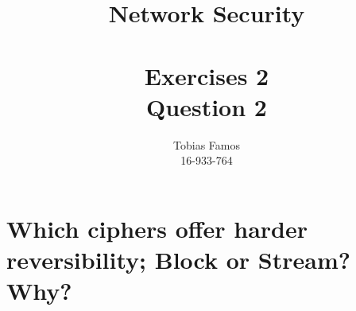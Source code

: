 \documentclass[11pt,a4paper]{article}
\title{Network Security \\ ~\\ \Large{Exercises 2 \\Question 2}}
\author{Tobias Famos\\ 16-933-764}
\begin{document}
    \maketitle
   \section{Which ciphers offer harder reversibility; Block or Stream? Why?}
\end{document}

